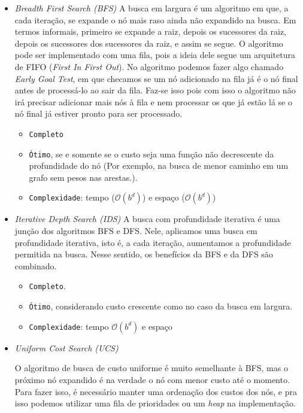 \documentclass{article}
\begin{document}
\begin{itemize}
	\item \textit{Breadth First Search (BFS)}
		A busca em largura é um algoritmo em que, a cada iteração,
		se expande o nó mais raso ainda não expandido na busca. Em termos informais,
		primeiro se expande a raiz, depois os sucessores da raiz, depois os sucessores
		dos sucessores da raiz, e assim se segue. O algoritmo pode ser implementado
		com uma fila, pois a ideia dele segue um arquitetura de FIFO (\textit{First In First Out}).
		No algoritmo podemos fazer algo chamado \textit{Early Goal Test}, em que checamos se um nó adicionado na fila
		já é o nó final antes de processá-lo ao sair da fila. Faz-se isso pois com isso
		o algoritmo não irá precisar adicionar mais nós à fila e nem processar os que já estão lá se o nó final
		já estiver pronto para ser processado.

		\begin{itemize}
			\item \texttt{Completo}
			\item \texttt{Ótimo}, se e somente se o custo seja uma função
				não decrescente da profundidade do nó (Por exemplo, na busca de menor caminho em
				um grafo sem pesos nas arestas.).
			\item \texttt{Complexidade}: tempo (\(\mathcal{O}(b^d)\)) e espaço (\(\mathcal{O}(b^d)\))
		\end{itemize}

	\item \textit{Iterative Depth Search (IDS)}
		A busca com profundidade iterativa é uma junção dos algoritmos
		BFS e DFS. Nele, aplicamos uma busca em profundidade iterativa, isto é, a cada iteração,
		aumentamos a profundidade permitida na busca. Nesse sentido,
		os benefícios da BFS e da DFS são combinado. 

		\begin{itemize}
			\item \texttt{Completo}.
		\item \texttt{Ótimo}, considerando custo crescente como no caso da busca em largura.
		\item \texttt{Complexidade}: tempo \(\mathcal{O}(b^d)\) e espaço
		\end{itemize}

	\item \textit{Uniform Cost Search (UCS)}

		O algoritmo de busca de custo uniforme é muito semelhante à BFS, mas
		o próximo nó expandido é na verdade o nó com menor custo até o momento. Para fazer isso,
		é necessário manter uma ordenação dos custos dos nós, e pra isso
		podemos utilizar uma fila de prioridades ou um \textit{heap} na
		implementação.


\end{itemize}
\end{document}

